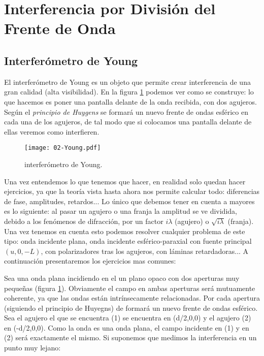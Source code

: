 \documentclass[12pt,a4paper]{book}
\numberwithin{equation}{section}
\numberwithin{figure}{section}
\newcommand{\1}{_{(1)}}
\newcommand{\2}{_{(2)}}
\theoremstyle{definition}
\begin{document}
\section{Interferencia por División del Frente de Onda}

\subsection{Interferómetro de Young}

El interferómetro de Young es un objeto que permite crear interferencia de una gran calidad (alta visibilidad). En la figura \ref{Fig:02.07-1} podemos ver como se construye: lo que hacemos es poner una pantalla delante de la onda recibida, con dos agujeros. Según el \textit{principio de Huygens} se formará un nuevo frente de ondas esférico en cada una de los agujeros, de tal modo que si colocamos una pantalla delante de ellas veremos como interfieren. \\

\begin{figure}[h!] \centering
\texttt{[image: 02-Young.pdf]}
\caption{interferómetro de Young.} \label{Fig:02.07-1}
\end{figure}

Una vez entendemos lo que tenemos que hacer, en realidad solo quedan hacer ejercicios, ya que la teoría vista hasta ahora nos permite calcular todo: diferencias de fase, amplitudes, retardos... Lo único que debemos tener en cuenta a mayores es lo siguiente: al pasar un agujero o una franja la amplitud se ve dividida, debido a los fenómenos de difracción, por un factor $i \lambda$ (agujero) o $\sqrt{i\lambda}$ (franja). Una vez tenemos en cuenta esto podemos resolver cualquier problema de este tipo: onda incidente plana, onda incidente esférico-paraxial con fuente principal $(u,0,-L)$, con polarizadores tras los agujeros, con láminas retardadoras...  A continuación presentaremos los ejercicios mas comunes: \\



\hrulefill

Sea una onda plana incidiendo en el un plano opaco con dos aperturas muy pequeñas (figura \ref{Fig:02.07-1}). Obviamente el campo en ambas aperturas será mutuamente coherente, ya que las ondas están intrínsecamente relacionadas. Por cada apertura (siguiendo el principio de Huyegns) de formará un nuevo frente de ondas esférico. Sea el agujero el que se encuentra (1) se encuentra en (d/2,0,0) y el agujero (2) en (-d/2,0,0). Como la onda es una onda plana, el campo incidente en (1) y en (2) será exactamente el mismo. Si suponemos que medimos la interferencia en un punto muy lejano:
\end{document}
